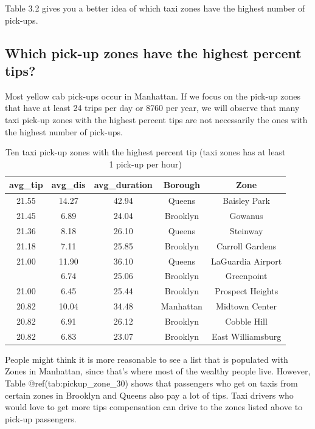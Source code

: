 \documentclass[12pt,twoside]{reedthesis}
\theoremstyle{definition}
\theoremstyle{definition}
\theoremstyle{definition}
\theoremstyle{remark}
\begin{document}
Table 3.2 gives you a better idea of which taxi zones have the highest
number of pick-ups.

\subsection{Which pick-up zones have the highest percent
tips?}\label{which-pick-up-zones-have-the-highest-percent-tips}

Most yellow cab pick-ups occur in Manhattan. If we focus on the pick-up
zones that have at least 24 trips per day or 8760 per year, we will
observe that many taxi pick-up zones with the highest percent tips are
not necessarily the ones with the highest number of pick-ups.
\begin{table}

\caption{\label{tab:unnamed-chunk-46}Ten taxi pick-up zones with the highest percent tip (taxi zones has at least 1 pick-up per hour)}
\centering
\begin{tabular}[t]{ccccc}
\toprule
avg\_tip & avg\_dis & avg\_duration & Borough & Zone\\
\midrule
21.55 & 14.27 & 42.94 & Queens & Baisley Park\\
21.45 & 6.89 & 24.04 & Brooklyn & Gowanus\\
21.36 & 8.18 & 26.10 & Queens & Steinway\\
21.18 & 7.11 & 25.85 & Brooklyn & Carroll Gardens\\
21.00 & 11.90 & 36.10 & Queens & LaGuardia Airport\\
\addlinespace
21.00 & 6.74 & 25.06 & Brooklyn & Greenpoint\\
21.00 & 6.45 & 25.44 & Brooklyn & Prospect Heights\\
20.82 & 10.04 & 34.48 & Manhattan & Midtown Center\\
20.82 & 6.91 & 26.12 & Brooklyn & Cobble Hill\\
20.82 & 6.83 & 23.07 & Brooklyn & East Williamsburg\\
\bottomrule
\end{tabular}
\end{table}
People might think it is more reasonable to see a list that is populated
with Zones in Manhattan, since that's where most of the wealthy people
live. However, Table @ref(tab:pickup\_zone\_30) shows that passengers
who get on taxis from certain zones in Brooklyn and Queens also pay a
lot of tips. Taxi drivers who would love to get more tips compensation
can drive to the zones listed above to pick-up passengers.
\end{document}
